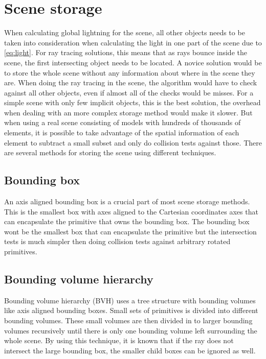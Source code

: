 \documentclass[]{report}   %
\begin{document}
\section{Scene storage}
When calculating global lightning for the scene, all other objects needs to be taken into consideration when calculating the light in one part of the scene due to \autoref{eq:light}.
For ray tracing solutions, this means that as rays bounce inside the scene, the first intersecting object needs to be located.
A novice solution would be to store the whole scene without any information about where in the scene they are.
When doing the ray tracing in the scene, the algorithm would have to check against all other objects, even if almost all of the checks would be misses.
For a simple scene with only few implicit objects, this is the best solution, the overhead when dealing with an more complex storage method would make it slower.
But when using a real scene consisting of models with hundreds of thousands of elements, it is possible to take advantage of the spatial information of each element to subtract a small subset and only do collision tests against those.
There are several methods for storing the scene using different techniques.

\subsection{Bounding box}
An axis aligned bounding box is a crucial part of most scene storage methods.
This is the smallest box with axes aligned to the Cartesian coordinates axes that can encapsulate the primitive that owns the bounding box.
The bounding box wont be the smallest box that can encapsulate the primitive but the intersection tests is much simpler then doing collision tests against arbitrary rotated primitives.

\subsection{Bounding volume hierarchy}
Bounding volume hierarchy (BVH) uses a tree structure with bounding volumes like axis aligned bounding boxes. 
Small sets of primitives is divided into different bounding volumes.
These small volumes are then divided in to larger bounding volumes recursively until there is only one bounding volume left surrounding the whole scene.
By using this technique, it is known that if the ray does not intersect the large bounding box, the smaller child boxes can be ignored as well.
\end{document}
